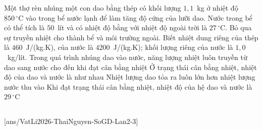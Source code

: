 	\begin{ex}%
		Một thợ rèn nhúng một con dao bằng thép có khối lượng $1{,}1$~kg ở nhiệt độ $850\,^\circ\text{C}$ vào trong bể nước lạnh để làm tăng độ cứng của lưỡi dao. Nước trong bể có thể tích là $50$~lít và có nhiệt độ bằng với nhiệt độ ngoài trời là $27\,^\circ\text{C}$. Bỏ qua sự truyền nhiệt cho thành bể và môi trường ngoài. Biết nhiệt dung riêng của thép là $460$~J/(kg.K), của nước là $4200$~J/(kg.K); khối lượng riêng của nước là $1{,}0$~kg/lít.
		\choiceTFt
		{\True Trong quá trình nhúng dao vào nước, năng lượng nhiệt luôn truyền từ dao sang nước cho đến khi đạt cân bằng nhiệt}
		{\True Ở trạng thái cân bằng nhiệt, nhiệt độ của dao và nước là như nhau}
		{Nhiệt lượng dao tỏa ra luôn lớn hơn nhiệt lượng nước thu vào}
		{\True Khi đạt trạng thái cân bằng nhiệt, nhiệt độ của hệ dao và nước là $29\,^\circ\text{C}$}
	\end{ex}

	\subsection*{}
	\setcounter{ex}{0}
	[ans/VatLi2026-ThaiNguyen-SoGD-Lan2-3]

